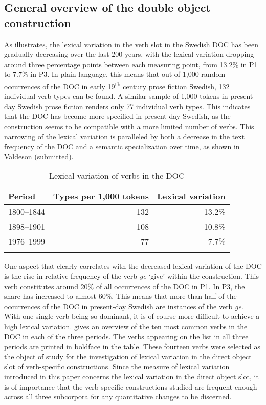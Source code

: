 \documentclass[output=paper]{langscibook}
\begin{document}
\subsection{General overview of the double object construction}\label{sec:valdeson:5.1}


As  illustrates, the lexical variation in the verb slot in the Swedish DOC has been gradually decreasing over the last 200 years, with the lexical variation dropping around three percentage points between each measuring point, from 13.2\% in P1 to 7.7\% in P3. In plain language, this means that out of 1,000 random occurrences of the DOC in early 19\textsuperscript{th} century prose fiction Swedish, 132 individual verb types can be found. A similar sample of 1,000 tokens in present-day Swedish prose fiction renders only 77 individual verb types. This indicates that the DOC has become more specified in present-day Swedish, as the construction seems to be compatible with a more limited number of verbs. This narrowing of the lexical variation is paralleled by both a decrease in the text frequency of the DOC and a semantic specialization over time, as shown in Valdeson (submitted).


\begin{table}
\caption{Lexical variation of verbs in the DOC}
\label{tab:valdeson:4}
\begin{tabular}{lrr}
\lsptoprule
Period & Types per 1,000 tokens & Lexical variation\\
\midrule
1800–1844 & 132 & 13.2\%\\
1898–1901 & 108 & 10.8\%\\
1976–1999 & 77 & 7.7\%\\
\lspbottomrule
\end{tabular}
\end{table}

One aspect that clearly correlates with the decreased lexical variation of the DOC is the rise in relative frequency of the verb \textit{ge} ‘give’ within the construction. This verb constitutes around 20\% of all occurrences of the DOC in P1. In P3, the share has increased to almost 60\%. This means that more than half of the occurrences of the DOC in present-day Swedish are instances of the verb \textit{ge}. With one single verb being so dominant, it is of course more difficult to achieve a high lexical variation.  gives an overview of the ten most common verbs in the DOC in each of the three periods. The verbs appearing on the list in all three periods are printed in boldface in the table. These fourteen verbs were selected as the object of study for the investigation of lexical variation in the direct object slot of verb-specific constructions. Since the measure of lexical variation introduced in this paper concerns the lexical variation in the direct object slot, it is of importance that the verb-specific constructions studied are frequent enough across all three subcorpora for any quantitative changes to be discerned.
\end{document}
